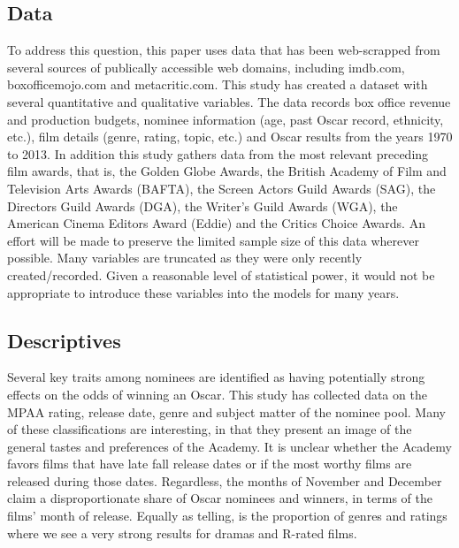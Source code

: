 \documentclass[jou,apacite]{apa6}
\begin{document}
\subsection{Data}
To address this question, this paper uses data that has been web-scrapped from several sources of publically accessible web domains, including imdb.com, boxofficemojo.com and metacritic.com. This study has created a dataset with several quantitative and qualitative variables. The data records box office revenue and production budgets, nominee information (age, past Oscar record, ethnicity, etc.), film details (genre, rating, topic, etc.) and Oscar results from the years 1970 to 2013. In addition this study gathers data from the most relevant preceding film awards, that is, the Golden Globe Awards, the British Academy of Film and Television Arts Awards (BAFTA), the Screen Actors Guild Awards (SAG), the Directors Guild Awards (DGA), the Writer's Guild Awards (WGA), the American Cinema Editors Award (Eddie) and the Critics Choice Awards. An effort will be made to preserve the limited sample size of this data wherever possible. Many variables are truncated as they were only recently created/recorded. Given a reasonable level of statistical power, it would not be appropriate to introduce these variables into the models for many years.

\subsection{Descriptives}
Several key traits among nominees are identified as having potentially strong effects on the odds of winning an Oscar. This study has collected data on the MPAA rating, release date, genre and subject matter of the nominee pool. Many of these classifications are interesting, in that they present an image of the general tastes and preferences of the Academy. It is unclear whether the Academy favors films that have late fall release dates or if the most worthy films are released during those dates. Regardless, the months of November and December claim a disproportionate share of Oscar nominees and winners, in terms of the films' month of release. Equally as telling, is the proportion of genres and ratings where we see a very strong results for dramas and R-rated films.
\end{document}

